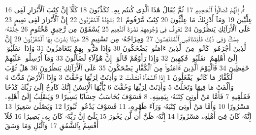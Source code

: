 {\tiny\colorbox{cl_aya}{16}} ثُمَّ إِنَّهُمْ لَصَالُوا۟ ٱلْجَحِيمِ
{\tiny\colorbox{cl_aya}{17}} ثُمَّ يُقَالُ هَٰذَا ٱلَّذِى كُنتُم بِهِۦ تُكَذِّبُونَ
{\tiny\colorbox{cl_aya}{18}} كَلَّآ إِنَّ كِتَٰبَ ٱلْأَبْرَارِ لَفِى عِلِّيِّينَ
{\tiny\colorbox{cl_aya}{19}} وَمَآ أَدْرَىٰكَ مَا عِلِّيُّونَ
{\tiny\colorbox{cl_aya}{20}} كِتَٰبٌ مَّرْقُومٌ
{\tiny\colorbox{cl_aya}{21}} يَشْهَدُهُ ٱلْمُقَرَّبُونَ
{\tiny\colorbox{cl_aya}{22}} إِنَّ ٱلْأَبْرَارَ لَفِى نَعِيمٍ
{\tiny\colorbox{cl_aya}{23}} عَلَى ٱلْأَرَآئِكِ يَنظُرُونَ
{\tiny\colorbox{cl_aya}{24}} تَعْرِفُ فِى وُجُوهِهِمْ نَضْرَةَ ٱلنَّعِيمِ
{\tiny\colorbox{cl_aya}{25}} يُسْقَوْنَ مِن رَّحِيقٍ مَّخْتُومٍ
{\tiny\colorbox{cl_aya}{26}} خِتَٰمُهُۥ مِسْكٌ وَفِى ذَٰلِكَ فَلْيَتَنَافَسِ ٱلْمُتَنَٰفِسُونَ
{\tiny\colorbox{cl_aya}{27}} وَمِزَاجُهُۥ مِن تَسْنِيمٍ
{\tiny\colorbox{cl_aya}{28}} عَيْنًا يَشْرَبُ بِهَا ٱلْمُقَرَّبُونَ
{\tiny\colorbox{cl_aya}{29}} إِنَّ ٱلَّذِينَ أَجْرَمُوا۟ كَانُوا۟ مِنَ ٱلَّذِينَ ءَامَنُوا۟ يَضْحَكُونَ
{\tiny\colorbox{cl_aya}{30}} وَإِذَا مَرُّوا۟ بِهِمْ يَتَغَامَزُونَ
{\tiny\colorbox{cl_aya}{31}} وَإِذَا ٱنقَلَبُوٓا۟ إِلَىٰٓ أَهْلِهِمُ ٱنقَلَبُوا۟ فَكِهِينَ
{\tiny\colorbox{cl_aya}{32}} وَإِذَا رَأَوْهُمْ قَالُوٓا۟ إِنَّ هَٰٓؤُلَآءِ لَضَآلُّونَ
{\tiny\colorbox{cl_aya}{33}} وَمَآ أُرْسِلُوا۟ عَلَيْهِمْ حَٰفِظِينَ
{\tiny\colorbox{cl_aya}{34}} فَٱلْيَوْمَ ٱلَّذِينَ ءَامَنُوا۟ مِنَ ٱلْكُفَّارِ يَضْحَكُونَ
{\tiny\colorbox{cl_aya}{35}} عَلَى ٱلْأَرَآئِكِ يَنظُرُونَ
{\tiny\colorbox{cl_aya}{36}} هَلْ ثُوِّبَ ٱلْكُفَّارُ مَا كَانُوا۟ يَفْعَلُونَ
{\tiny\colorbox{cl_aya}{1}} إِذَا ٱلسَّمَآءُ ٱنشَقَّتْ
{\tiny\colorbox{cl_aya}{2}} وَأَذِنَتْ لِرَبِّهَا وَحُقَّتْ
{\tiny\colorbox{cl_aya}{3}} وَإِذَا ٱلْأَرْضُ مُدَّتْ
{\tiny\colorbox{cl_aya}{4}} وَأَلْقَتْ مَا فِيهَا وَتَخَلَّتْ
{\tiny\colorbox{cl_aya}{5}} وَأَذِنَتْ لِرَبِّهَا وَحُقَّتْ
{\tiny\colorbox{cl_aya}{6}} يَٰٓأَيُّهَا ٱلْإِنسَٰنُ إِنَّكَ كَادِحٌ إِلَىٰ رَبِّكَ كَدْحًا فَمُلَٰقِيهِ
{\tiny\colorbox{cl_aya}{7}} فَأَمَّا مَنْ أُوتِىَ كِتَٰبَهُۥ بِيَمِينِهِۦ
{\tiny\colorbox{cl_aya}{8}} فَسَوْفَ يُحَاسَبُ حِسَابًا يَسِيرًا
{\tiny\colorbox{cl_aya}{9}} وَيَنقَلِبُ إِلَىٰٓ أَهْلِهِۦ مَسْرُورًا
{\tiny\colorbox{cl_aya}{10}} وَأَمَّا مَنْ أُوتِىَ كِتَٰبَهُۥ وَرَآءَ ظَهْرِهِۦ
{\tiny\colorbox{cl_aya}{11}} فَسَوْفَ يَدْعُوا۟ ثُبُورًا
{\tiny\colorbox{cl_aya}{12}} وَيَصْلَىٰ سَعِيرًا
{\tiny\colorbox{cl_aya}{13}} إِنَّهُۥ كَانَ فِىٓ أَهْلِهِۦ مَسْرُورًا
{\tiny\colorbox{cl_aya}{14}} إِنَّهُۥ ظَنَّ أَن لَّن يَحُورَ
{\tiny\colorbox{cl_aya}{15}} بَلَىٰٓ إِنَّ رَبَّهُۥ كَانَ بِهِۦ بَصِيرًا
{\tiny\colorbox{cl_aya}{16}} فَلَآ أُقْسِمُ بِٱلشَّفَقِ
{\tiny\colorbox{cl_aya}{17}} وَٱلَّيْلِ وَمَا وَسَقَ
